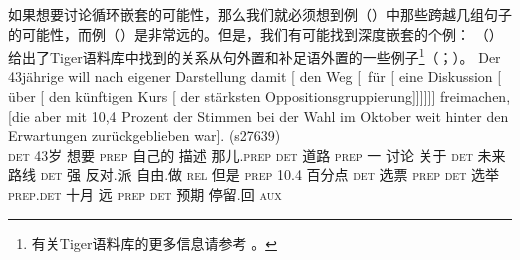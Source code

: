 如果想要讨论循环嵌套的可能性，那么我们就必须想到例（）中那些跨越几组句子的可能性，而例（）是非常远的。但是，我们有可能找到深度嵌套的个例：
（）给出了Tiger语料库中找到的关系从句外置和补足语外置的一些例子\footnote{%
有关Tiger语料库的更多信息请参考 。
}（\citealp[--79]{Mueller2007c}；\citealp[\S~2.1]{MM2009a}）。
\eal
\ex 
\gll Der 43jährige will nach eigener Darstellung damit [ den Weg [~für [ eine
  Diskussion [ über [ den künftigen Kurs [ der stärksten
  Oppositions\-gruppierung]]]]]] freimachen, [die aber mit 10,4 Prozent
  der Stimmen bei der Wahl im Oktober weit hinter den Erwartungen zurückgeblieben war]. (s27639)\\
  \textsc{det} 43岁 想要 \textsc{prep} 自己的 描述 那儿.\textsc{prep} {} \textsc{det} 道路 \hspaceThis{[\sub{PP}~}\textsc{prep} {} 一 讨论 {} 关于 {} \textsc{det} 未来 路线 {} \textsc{det} 强
  反对.派 自由.做 \spacebr{}\textsc{rel} 但是 \textsc{prep} 10.4 百分点
  \textsc{det} 选票 \textsc{prep} \textsc{det} 选举 \textsc{prep}.\textsc{det} 十月 远 \textsc{prep} \textsc{det} 预期 停留.回 \textsc{aux}\\
